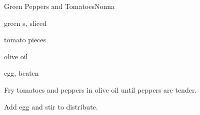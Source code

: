 \begin{recipe}{Green Peppers and Tomatoes}{Nonna}{}

\begin{ingredients}
\item green s, sliced
\item tomato pieces
\item olive oil
\item egg, beaten
\end{ingredients}

\begin{directions}
\item Fry tomatoes and peppers in olive oil until peppers are tender.
\item Add egg and stir to distribute.
\end{directions}

\end{recipe}
